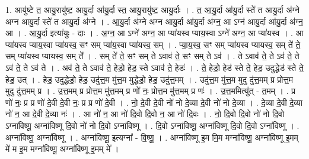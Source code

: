 \documentclass[17pt]{extarticle}
\begin{document}
1. आयु॑ष्टे त॒ आयु॒रायु॑ष्ट॒ आयु॒र्दा आ॑यु॒र्दा स्त॒ आयु॒रायु॑ष्ट॒ आयु॒र्दाः । . त॒ आ॒यु॒र्दा आ॑यु॒र्दा स्ते॑ त आयु॒र्दा अ॑ग्ने अग्न आयु॒र्दा स्ते॑ त आयु॒र्दा अ॑ग्ने । . आ॒यु॒र्दा अ॑ग्ने अग्न आयु॒र्दा आ॑यु॒र्दा अ॑ग्न॒ आ ऽग्न॑ आयु॒र्दा आ॑यु॒र्दा अ॑ग्न॒ आ । . आ॒यु॒र्दा इत्या॑युः - दाः । . अ॒ग्न॒ आ ऽग्ने॑ अग्न॒ आ प्या॑यस्व प्याय॒स्वा ऽग्ने॑ अग्न॒ आ प्या॑यस्व । . आ प्या॑यस्व प्याय॒स्वा प्या॑यस्व॒ सꣳ सम् प्या॑य॒स्वा प्या॑यस्व॒ सम् । . प्या॒य॒स्व॒ सꣳ सम् प्या॑यस्व प्यायस्व॒ सम् ते॑ ते॒ सम् प्या॑यस्व प्यायस्व॒ सम् ते᳚ । . सम् ते॑ ते॒ सꣳ सम् ते ऽवाव॑ ते॒ सꣳ सम् ते ऽव॑ । . ते ऽवाव॑ ते॒ ते ऽव॑ ते॒ ते ऽव॑ ते॒ ते ऽव॑ ते । . अव॑ ते॒ ते ऽवाव॑ ते॒ हेडो॒ हेड॒ स्ते ऽवाव॑ ते॒ हेडः॑ । . ते॒ हेडो॒ हेड॑ स्ते ते॒ हेड॒ उदुद्धेड॑ स्ते ते॒ हेड॒ उत् । . हेड॒ उदुद्धेडो॒ हेड॒ उदु॑त्त॒म मु॑त्त॒म मुद्धेडो॒ हेड॒ उदु॑त्त॒मम् । . उदु॑त्त॒म मु॑त्त॒म मुदु दु॑त्त॒मम् प्र प्रोत्त॒म मुदु दु॑त्त॒मम् प्र । . उ॒त्त॒मम् प्र प्रोत्त॒म मु॑त्त॒मम् प्र णो॑ नः॒ प्रोत्त॒म मु॑त्त॒मम् प्र णः॑ । . उ॒त्त॒ममित्यु॑त् - त॒मम् । . प्र णो॑ नः॒ प्र प्र णो॑ दे॒वी दे॒वी नः॒ प्र प्र णो॑ दे॒वी । . नो॒ दे॒वी दे॒वी नो॑ नो दे॒व्या दे॒वी नो॑ नो दे॒व्या । . दे॒व्या दे॒वी दे॒व्या नो॑ न॒ आ दे॒वी दे॒व्या नः॑ । . आ नो॑ न॒ आ नो॑ दि॒वो दि॒वो न॒ आ नो॑ दि॒वः । . नो॒ दि॒वो दि॒वो नो॑ नो दि॒वो ऽग्ना॑विष्णू॒ अग्ना॑विष्णू दि॒वो नो॑ नो दि॒वो ऽग्ना॑विष्णू । . दि॒वो ऽग्ना॑विष्णू॒ अग्ना॑विष्णू दि॒वो दि॒वो ऽग्ना॑विष्णू । . अग्ना॑विष्णू॒ अग्ना॑विष्णू । . अग्ना॑विष्णू॒ इत्यग्ना᳚ - वि॒ष्णू॒ । . अग्ना॑विष्णू इ॒म मि॒म मग्ना॑विष्णू॒ अग्ना॑विष्णू इ॒मम् मे॑ म इ॒म मग्ना॑विष्णू॒ अग्ना॑विष्णू इ॒मम् मे᳚ । \newline
\end{document}
